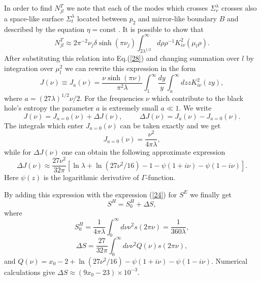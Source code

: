 \documentclass[superscriptaddress,showpacs,preprintnumbers,amsmath,amssymb,
nofootinbib,twocolumn,aps,prd,10pt]{revtex4-1}
\begin{document}
In order  to find  $N_{jl}^T$ we  note that  each of  the modes  which
crosses $\Sigma^{\lambda}_v$ crosses  also a space-like surface
$\Sigma^{\lambda}_t$ located
between  $p_2$  and  mirror-like  boundary  $B$  and  described by the
equation $\eta =$const . It is possible to show that
\begin{equation}
N_{jl}^T \approx 2\pi^{-2} \nu_j \delta \sinh (\pi \nu_j )
\int_{2\lambda ^{1/2}}^{\infty} d\rho \rho^{-1}K_{i\nu }^2 (\mu_l \rho ) .
\label{27}
\end{equation}
After substituting this relation  into Eq.(\ref{28}) and changing  summation
over $l$ by integration over $\mu_l^2$ we can rewrite this  expression
in the form
\begin{equation}
J(\nu ) \equiv J_a (\nu )
=\frac{\nu \sinh (\pi \nu )}{\pi ^2 \lambda }
\int_1^{\infty}\frac{dy}{y}\int_a^{\infty}
dz z K_{i\nu}^2 (zy) ,\label{29}
\end{equation}
where $a=(27\lambda )^{1/2}\nu /2$. For the frequencies $\nu$
which contribute to the black hole's entropy the parameter
$a$ is extremely small $a\ll 1$. We write
\begin{equation}
J(\nu ) =J_{a=0}(\nu )+\Delta J(\nu ),
\hspace{1cm}\Delta J(\nu ) =J_a (\nu )-J_{a=0}(\nu ) . \label{30}
\end{equation}
The integrals which enter $J_{a=0}(\nu )$ can be taken exactly and
we get
\begin{equation}
J_{a=0}(\nu ) =\frac{\nu ^2}{4\pi \lambda}, \label{31}
\end{equation}
while for $\Delta J(\nu )$ one can obtain the following
approximate expression
\begin{equation}
\Delta J(\nu ) \approx \frac{27\nu ^2}{32\pi}[\ln \lambda +
\ln (27\nu ^2 /16)-1 -\psi (1+i\nu )-\psi (1-i\nu )].
\label{32}
\end{equation}
Here $\psi (z)$ is the logarithmic derivative of $\Gamma$-function.

By adding this expression with the expression (\ref{24})
for $S^E$ we finally get
\begin{equation}
S^H =S^H_0 +\Delta S, \label{34}
\end{equation}
where
\begin{equation}
S^H_0 =\frac{1}{4\pi \lambda}\int_0^{\infty}d\nu \nu ^2 s(2\pi \nu )
=\frac{1}{360\lambda}, \label{35}
\end{equation}
\begin{equation}
\Delta S = \frac{27}{32\pi}\int_0^{\infty}d\nu \nu^2 Q(\nu )s(2\pi \nu ) ,
\label{36}
\end{equation}
and $Q(\nu )=x_0 -2 +\ln (27\nu ^2 /16)-\psi (1+i\nu )-\psi (1-i\nu )$.
Numerical calculations give $\Delta S\approx (9x_0 -23)\times
10^{-3}$.
\end{document}
